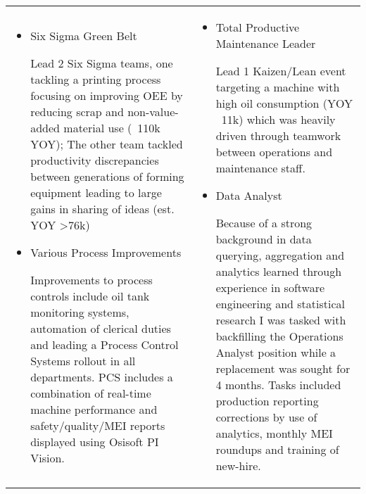 \documentclass[a4paper, oneside, final, 10pt]{scrartcl} %
\begin{document}
\begin{center}
\vspace{-10pt}
\begin{tabularx}{0.97\linewidth}{XX}
    \vspace{-10pt}
    \begin{itemize}\setlength\itemsep{0em}
        \item{Six Sigma Green Belt}
        \begin{sloppypar}
            Lead 2 Six Sigma teams, one tackling a printing process focusing on improving OEE by reducing scrap and non-value-added material use (~110k YOY); The other team tackled productivity discrepancies between generations of forming equipment leading to large gains in sharing of ideas (est. YOY >76k)
        \end{sloppypar}
        \item{Various Process Improvements}
        \begin{sloppypar}
            Improvements to process controls include oil tank monitoring systems, automation of clerical duties and leading a Process Control Systems rollout in all departments. PCS includes a combination of real-time machine performance and safety/quality/MEI reports displayed using Osisoft PI Vision.
        \end{sloppypar}
    \end{itemize} & \vspace{-10pt} \begin{itemize}\setlength\itemsep{0em}
        \item{Total Productive Maintenance Leader}
        \begin{sloppypar}
            Lead 1 Kaizen/Lean event targeting a machine with high oil consumption (YOY ~11k) which was heavily driven through teamwork between operations and maintenance staff.
        \end{sloppypar}
        \item{Data Analyst}
        \begin{sloppypar}
            Because of a strong background in data querying, aggregation and analytics learned through experience in software engineering and statistical research I was tasked with backfilling the Operations Analyst position while a replacement was sought for 4 months. Tasks included production reporting corrections by use of analytics, monthly MEI roundups and training of new-hire. 
        \end{sloppypar}
    \end{itemize}
\end{tabularx}


\end{center}
\end{document}
